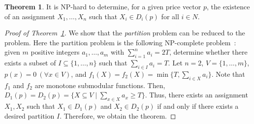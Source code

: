 \documentclass[letterpaper]{article}
\theoremstyle{definition}
\newtheorem{theorem}{Theorem}
\begin{document}
\begin{theorem}
\label{thm:NPhardmultiple}
  It is NP-hard to determine,
  for a given price vector $p$,
  the existence of an assignment \(X_1,\dots,X_n\) such that
  $X_i\in D_i(p)$ for all $i\in N$.
\end{theorem}
\begin{proof}[Proof of Theorem~\ref{thm:NPhardmultiple}]
  We show that the \emph{partition} problem can be reduced to the problem.
  Here the partition problem is the following NP-complete problem~\cite{garey1979computers}:
  given $m$ positive integers $a_1,\dots,a_m$ with \(\sum_{i=1}^n a_i=2T\),
  determine whether there exists a subset of $I\subseteq \{1,\dots,n\}$
  such that \(\sum_{i\in I}a_i=T\).
  Let $n=2$, $V=\{1,\dots,m\}$, $p(x)=0~(\forall x\in V)$, and $f_1(X)=f_2(X)=\min\{T,\sum_{i\in X}a_i\}$.
  Note that $f_1$ and $f_2$ are monotone submodular functions.
  Then, \(D_1(p)=D_2(p)=\{X\subseteq V\mid \sum_{x\in X}a_x\ge T\}\).
  Thus, there exists an assignment \(X_1,X_2\) such that \(X_1\in D_1(p)\) and \(X_2\in D_2(p)\)
  if and only if there exists a desired partition \(I\).
  Therefore, we obtain the theorem.
\end{proof}
\end{document}
